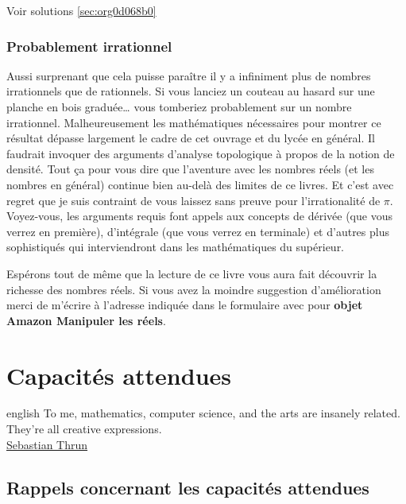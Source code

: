 \documentclass[a4paper, 11pt, twoside]{article}
\begin{document}
Voir solutions \ref{sec:org0d068b0}

\subsubsection{Probablement irrationnel}
\label{sec:orge9f6d46}

Aussi surprenant que cela puisse paraître il y a infiniment plus
de nombres irrationnels que de rationnels. Si vous lanciez un
couteau au hasard sur une planche en bois graduée\ldots{} vous
tomberiez probablement sur un nombre irrationnel. Malheureusement
les mathématiques nécessaires pour montrer ce résultat dépasse
largement le cadre de cet ouvrage et du lycée en général. Il
faudrait invoquer des arguments d'analyse topologique à propos de
la notion de densité. Tout ça pour vous dire que l'aventure avec
les nombres réels (et les nombres en général) continue bien
au-delà des limites de ce livres. Et c'est avec regret que je suis
contraint de vous laissez sans preuve pour l'irrationalité de
\(\pi\). Voyez-vous, les arguments requis font appels aux concepts
de dérivée (que vous verrez en première), d'intégrale (que vous
verrez en terminale) et d'autres plus sophistiqués qui
interviendront dans les mathématiques du supérieur.

Espérons tout de même que la lecture de ce livre vous aura fait
découvrir la richesse des nombres réels. Si vous avez la moindre
suggestion d'amélioration merci de m'écrire à l'adresse
indiquée dans le formulaire avec pour \textbf{objet Amazon Manipuler les réels}.
\stopcontents[level-2]
\stopcontents[level-1]

\section{Capacités attendues}
\label{sec:org5737607}

\begin{foreigndisplayquote}{english}
To me, mathematics, computer science, and the arts are insanely
related. They’re all creative expressions.\\

\href{https://en.wikipedia.org/wiki/Sebastian\_Thrun}{Sebastian Thrun}
\end{foreigndisplayquote}

\startcontents[level-1]

\subsection{Rappels concernant les capacités attendues}
\label{sec:org7c7ae07}
\end{document}

